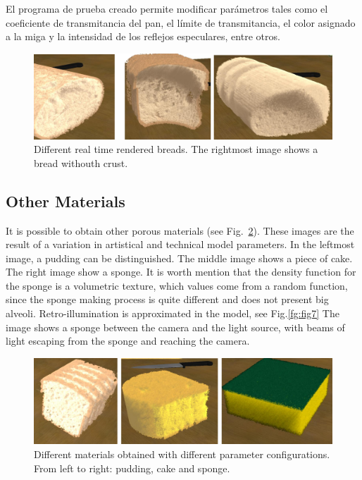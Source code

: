 El programa de prueba creado permite modificar parámetros tales como el coeficiente de transmitancia del pan, el límite de transmitancia, el color asignado a la miga y la intensidad de los reflejos especulares, entre otros.

\begin{figure}[htb!]
  \centerline{\includegraphics[width=13cm]{fig5}}
  \caption{Different real time rendered breads. The rightmost image shows a bread withouth crust.}
  \label{fg:fig5}
\end{figure}

\subsection{Other Materials}
It is possible to obtain other porous materials (see Fig.~\ref{fg:fig6}).
These images are the result of a variation in artistical and technical model parameters.
In the leftmost image, a pudding can be distinguished.
The middle image shows a piece of cake.
The right image show a sponge.
It is worth mention that the density function for the sponge is a volumetric texture, which values come from a random function, since the sponge making process is quite different and does not present big alveoli. 
Retro-illumination is approximated in the model, see Fig.\ref{fg:fig7}
The image shows a sponge between the camera and the light source, with beams of light escaping from the sponge and reaching the camera.

\begin{figure}[htb!]
  \centerline{\includegraphics[width=13cm]{fig6}}
  \caption{Different materials obtained with different parameter configurations. From left to right: pudding, cake and sponge.}
  \label{fg:fig6}

\end{figure}

